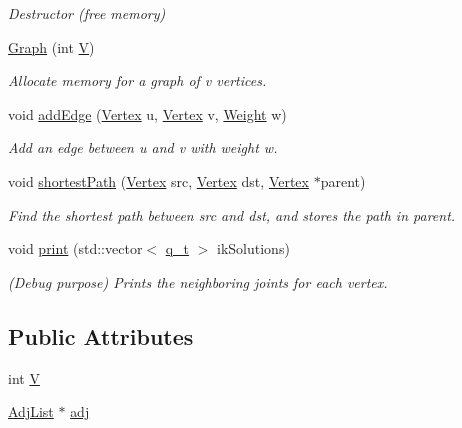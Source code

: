 \begin{DoxyCompactItemize}
\begin{DoxyCompactList}\small\item\em Destructor (free memory) \end{DoxyCompactList}\item 
\hyperlink{classGraph_af3ff6b295df8bf3bee0bafd7c7d56915}{Graph} (int \hyperlink{classGraph_a2b722f7cfa7a21e4cb5fae488b3d4dcc}{V})
\begin{DoxyCompactList}\small\item\em Allocate memory for a graph of v vertices. \end{DoxyCompactList}\item 
void \hyperlink{classGraph_a5ee0ddff7772ed07378369071aecfa4e}{add\-Edge} (\hyperlink{GraphSearch_8h_ac4ad596873793f04ffb3f20a24d93e0f}{Vertex} u, \hyperlink{GraphSearch_8h_ac4ad596873793f04ffb3f20a24d93e0f}{Vertex} v, \hyperlink{GraphSearch_8h_ad8909b856fa70c7731c787994276fb03}{Weight} w)
\begin{DoxyCompactList}\small\item\em Add an edge between u and v with weight w. \end{DoxyCompactList}\item 
void \hyperlink{classGraph_a3a143bd5f8737376a5946be81e6a27eb}{shortest\-Path} (\hyperlink{GraphSearch_8h_ac4ad596873793f04ffb3f20a24d93e0f}{Vertex} src, \hyperlink{GraphSearch_8h_ac4ad596873793f04ffb3f20a24d93e0f}{Vertex} dst, \hyperlink{GraphSearch_8h_ac4ad596873793f04ffb3f20a24d93e0f}{Vertex} $\ast$parent)
\begin{DoxyCompactList}\small\item\em Find the shortest path between src and dst, and stores the path in parent. \end{DoxyCompactList}\item 
void \hyperlink{classGraph_ad3e6afc5b15ba1f1318f158dad1755f0}{print} (std\-::vector$<$ \hyperlink{types_8h_ac93021229dd8838987c783b2a6f13b92}{q\-\_\-t} $>$ ik\-Solutions)
\begin{DoxyCompactList}\small\item\em (Debug purpose) Prints the neighboring joints for each vertex. \end{DoxyCompactList}\end{DoxyCompactItemize}
\subsection*{Public Attributes}
\begin{DoxyCompactItemize}
\item 
int \hyperlink{classGraph_a2b722f7cfa7a21e4cb5fae488b3d4dcc}{V}
\item 
\hyperlink{GraphSearch_8h_a12a5d649052ffa035f6ec47b6589b871}{Adj\-List} $\ast$ \hyperlink{classGraph_a45d7812cbbb4c9b9e59bffb5b52eaee1}{adj}
\end{DoxyCompactItemize}


